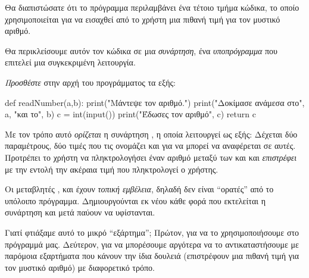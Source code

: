 \documentclass[a4paper,11pt,oneside]{book}
\begin{document}
\begin{step}
Θα διαπιστώσατε ότι το πρόγραμμα περιλαμβάνει ένα τέτοιο τμήμα κώδικα, το οποίο χρησιμοποιείται για να εισαχθεί από το χρήστη μια πιθανή τιμή για τον μυστικό αριθμό.

Θα περικλείσουμε αυτόν τον κώδικα σε μια \emph{συνάρτηση}, ένα \emph{υποπρόγραμμα} που επιτελεί μια συγκεκριμένη λειτουργία.

\emph{Προσθέστε} στην αρχή του προγράμματος τα εξής:

\begin{pynew}
def readNumber(a,b):
    print("Μάντεψε τον αριθμό.")
    print("Δοκίμασε ανάμεσα στο", a, "και το", b)
    c = int(input())    
    print("Έδωσες τον αριθμό", c)
    return c
\end{pynew}

Με τον τρόπο αυτό \emph{ορίζεται} η συνάρτηση , η οποία λειτουργεί ως εξής: Δέχεται δύο παραμέτρους, δύο τιμές που τις ονομάζει  και  για να μπορεί να αναφέρεται σε αυτές. Προτρέπει το χρήστη να πληκτρολογήσει έναν αριθμό μεταξύ των  και  και \emph{επιστρέφει} με την εντολή  την ακέραια τιμή που πληκτρολογεί ο χρήστης.

\begin{note}
Οι μεταβλητές ,  και  έχουν \emph{τοπική εμβέλεια}, δηλαδή δεν είναι ``ορατές'' από το υπόλοιπο πρόγραμμα. Δημιουργούνται εκ νέου κάθε φορά που εκτελείται η συνάρτηση  και μετά παύουν να υφίστανται.
\end{note}

Γιατί φτιάξαμε αυτό το μικρό ``εξάρτημα''; Πρώτον, για να το χρησιμοποιήσουμε στο πρόγραμμά μας. Δεύτερον, για να μπορέσουμε αργότερα να το αντικαταστήσουμε με παρόμοια εξαρτήματα που κάνουν την ίδια δουλειά (επιστρέφουν μια πιθανή τιμή για τον μυστικό αριθμό) με διαφορετικό τρόπο.
\end{step}
\end{document}

